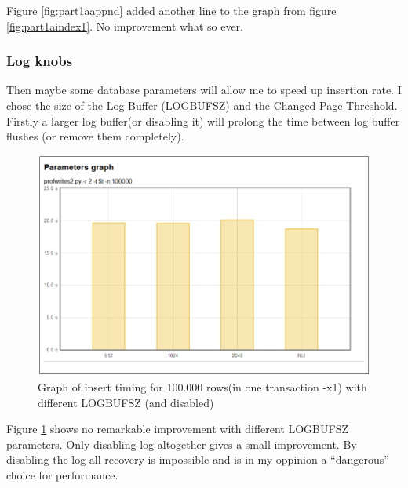 Figure \ref{fig:part1aappnd} added another line to the graph from figure
\ref{fig:part1aindex1}. No improvement what so ever.

\subsubsection{Log knobs}
Then maybe some database parameters will allow me to speed up insertion rate. I
chose the size of the Log Buffer (LOGBUFSZ) and the Changed Page Threshold.
Firstly a larger log buffer(or disabling it) will prolong the time between log
buffer flushes (or remove them completely).
\begin{figure}
  \centering
  \includegraphics[width=12cm]{assignment2/logb}
  \caption[Insert performance -logbufsz]{Graph of insert timing for 100.000 rows(in one
  transaction -x1) with different LOGBUFSZ (and disabled)}\label{fig:part1alogb}
\end{figure}
Figure \ref{fig:part1alogb} shows no remarkable improvement with different
LOGBUFSZ parameters. Only disabling log altogether gives a small improvement. By
disabling the log all recovery is impossible and is in my oppinion a
``dangerous'' choice for performance.

